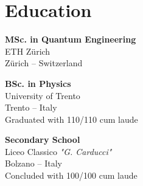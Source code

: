 \documentclass[a4paper,10pt]{article}
\begin{document}
\begin{adjustbox}{valign=t}
\begin{minipage}{0.3\textwidth}
\vfill

\section*{Education}
	\begin{description}
	\raggedright
	\item [\normalfont \textcolor{ColorTwo}{2021 - Now}]
    \textbf{MSc. in Quantum Engineering}\\
	ETH Zürich\\
	Zürich -- Switzerland

	\item [\normalfont \textcolor{ColorTwo}{2018 - 2021}] \textbf{BSc. in
	Physics}\\
	University of Trento\\
	Trento -- Italy\\
    \small{Graduated with 110/110 cum laude}
    \normalsize

	\item [\normalfont \textcolor{ColorTwo}{2013 - 2018}] \textbf{Secondary School}\\ 
	Liceo Classico \textit{"G. Carducci"} \\
	Bolzano -- Italy \\
    \small{Concluded with 100/100 cum laude} \normalsize
\end{description}

\vfill
\end{minipage}
\end{adjustbox}
%
%
%
\hfill
\begin{adjustbox}{valign=t}
\begin{minipage}{0.05\textwidth} %
\MyVerticalRule  %
\end{minipage}
\end{adjustbox}
\hfill
%
\end{document}
